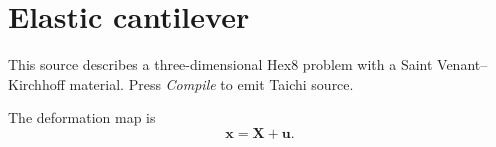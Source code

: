 
\section{Elastic cantilever}

This source describes a three-dimensional Hex8 problem with a Saint
Venant--Kirchhoff material. Press \emph{Compile} to emit Taichi source.

The deformation map is
\[
  \boldsymbol{x} = \boldsymbol{X} + \boldsymbol{u}.
\]
